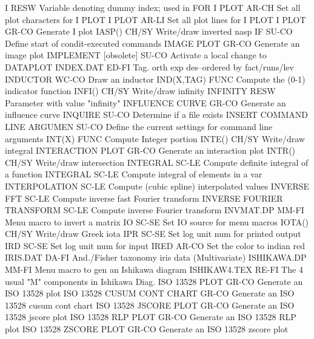 I                           RESW  Variable denoting dummy index; used in FOR
I PLOT                      AR-CH Set all plot characters for I PLOT
I PLOT                      AR-LI Set all plot lines for I PLOT
I PLOT                      GR-CO Generate I plot
IASP()                      CH/SY Write/draw inverted nasp
IF                          SU-CO Define start of condit-executed commands
IMAGE PLOT                  GR-CO Generate an image plot
IMPLEMENT  [obsolete]       SU-CO Activate a local change to DATAPLOT
INDEX.DAT                   ED-FI Tag. orth exp des--ordered by fact/runs/lev
INDUCTOR                    WC-CO Draw an inductor
IND(X,TAG)                  FUNC  Compute the (0-1) indicator function
INFI()                      CH/SY Write/draw infinity
INFINITY                    RESW  Parameter with value "infinity"
INFLUENCE CURVE             GR-CO Generate an influence curve
INQUIRE                     SU-CO Determine if a file exists
INSERT COMMAND LINE ARGUMEN SU-CO Define the current settings for command line arguments
INT(X)                      FUNC  Compute Integer portion
INTE()                      CH/SY Write/draw integral
INTERACTION PLOT            GR-CO Generate an interaction plot
INTR()                      CH/SY Write/draw intersection
INTEGRAL                    SC-LE Compute definite integral of a function
INTEGRAL                    SC-LE Compute integral of elements in a var
INTERPOLATION               SC-LE Compute (cubic spline) interpolated values
INVERSE FFT                 SC-LE Compute inverse fast Fourier transform
INVERSE FOURIER TRANSFORM   SC-LE Compute inverse Fourier transform
INVMAT.DP                   MM-FI Menu macro to invert a matrix
IO                          SC-SE Set IO source for menu macros
IOTA()                      CH/SY Write/draw Greek iota
IPR                         SC-SE Set log unit num for printed output
IRD                         SC-SE Set log unit num for input
IRED                        AR-CO Set the color to indian red
IRIS.DAT                    DA-FI And./Fisher taxonomy iris data (Multivariate)
ISHIKAWA.DP                 MM-FI Menu macro to gen an Ishikawa diagram
ISHIKAW4.TEX                RE-FI The 4 usual "M" components in Ishikawa Diag.
ISO 13528 PLOT              GR-CO Generate an ISO 13528 plot
ISO 13528 CUSUM CONT CHART  GR-CO Generate an ISO 13528 cusum cont chart
ISO 13528 JSCORE PLOT       GR-CO Generate an ISO 13528 jscore plot
ISO 13528 RLP PLOT          GR-CO Generate an ISO 13528 RLP plot
ISO 13528 ZSCORE PLOT       GR-CO Generate an ISO 13528 zscore plot

